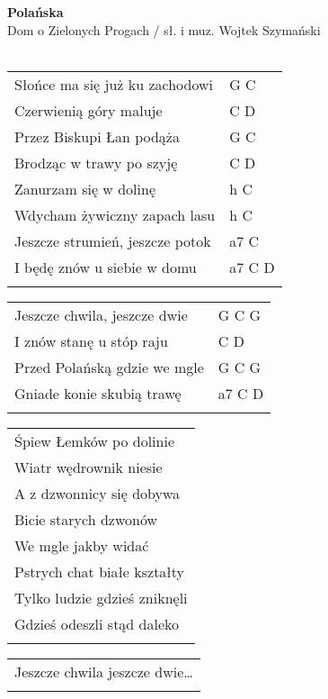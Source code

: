 \documentclass[a5paper]{article}
\begin{document}


\noindent
\fontsize{12pt}{15pt}\selectfont
\textbf{Polańska} \\
\fontsize{8pt}{10pt}\selectfont
Dom o Zielonych Progach / sł. i muz. Wojtek Szymański \\ \\
\fontsize{10pt}{12pt}\selectfont
{}
\begin{tabular}{@{}p{7.50cm}p{3cm}@{}}
\noindent
Słońce ma się już ku zachodowi & G C \\
Czerwienią góry maluje & C D \\
Przez Biskupi Łan podąża & G C \\
Brodząc w trawy po szyję & C D \\
Zanurzam się w dolinę & h C \\
Wdycham żywiczny zapach lasu & h C \\
Jeszcze strumień, jeszcze potok & a7 C \\
I będę znów u siebie w domu & a7 C D \\ \\
\end{tabular}

\noindent
\begin{tabular}{@{}p{6.50cm}p{3cm}@{}}
Jeszcze chwila, jeszcze dwie & G C G \\
I znów stanę u stóp raju & C D \\
Przed Polańską gdzie we mgle & G C G \\
Gniade konie skubią trawę & a7 C D \\ \\
\end{tabular}

\noindent
\begin{tabular}{@{}p{7.50cm}@{}}
Śpiew Łemków po dolinie \\
Wiatr wędrownik niesie \\
A z dzwonnicy się dobywa \\
Bicie starych dzwonów \\
We mgle jakby widać \\
Pstrych chat białe kształty \\
Tylko ludzie gdzieś zniknęli \\
Gdzieś odeszli stąd daleko \\ \\
\end{tabular}

\noindent
\begin{tabular}{@{}p{6.50cm}@{}}
Jeszcze chwila jeszcze dwie… \\ \\
\end{tabular}
\end{document}
